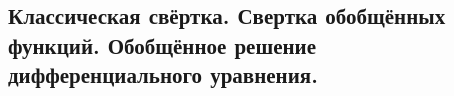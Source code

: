 \subsection{Классическая свёртка. Свертка обобщённых функций. Обобщённое решение дифференциального уравнения.}
